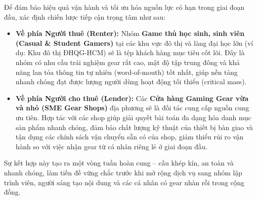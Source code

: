 Để đảm bảo hiệu quả vận hành và tối ưu hóa nguồn lực có hạn trong giai đoạn đầu, \projectname{} xác định chiến lược tiếp cận trọng tâm như sau:
\begin{itemize}
    \item \textbf{Về phía Người thuê (Renter):} Nhóm \textbf{Game thủ học sinh, sinh viên (Casual \& Student Gamers)} tại các khu vực đô thị và làng đại học lớn (ví dụ: Khu đô thị ĐHQG-HCM) sẽ là tệp khách hàng mục tiêu cốt lõi. Đây là nhóm có nhu cầu trải nghiệm gear rất cao, mật độ tập trung đông và khả năng lan tỏa thông tin tự nhiên (word-of-mouth) tốt nhất, giúp nền tảng nhanh chóng đạt được lượng người dùng hoạt động tối thiểu (critical mass).
    \item \textbf{Về phía Người cho thuê (Lender):} Các \textbf{Cửa hàng Gaming Gear vừa và nhỏ (SME Gear Shops)} địa phương sẽ là đối tác cung cấp nguồn cung ưu tiên. Hợp tác với các shop giúp \projectname{} giải quyết bài toán đa dạng hóa danh mục sản phẩm nhanh chóng, đảm bảo chất lượng kỹ thuật của thiết bị bàn giao và tận dụng các chính sách vận chuyển sẵn có của shop, giảm thiểu rủi ro vận hành so với việc nhận gear từ cá nhân riêng lẻ ở giai đoạn đầu.
\end{itemize}
Sự kết hợp này tạo ra một vòng tuần hoàn cung -- cầu khép kín, an toàn và nhanh chóng, làm tiền đề vững chắc trước khi mở rộng dịch vụ sang nhóm lập trình viên, người sáng tạo nội dung và các cá nhân có gear nhàn rỗi trong cộng đồng.
